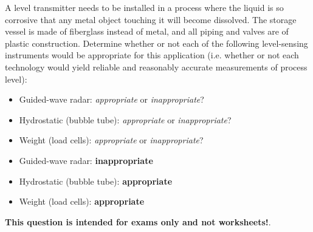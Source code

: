 

A level transmitter needs to be installed in a process where the liquid is so corrosive that any metal object touching it will become dissolved.  The storage vessel is made of fiberglass instead of metal, and all piping and valves are of plastic construction.  Determine whether or not each of the following level-sensing instruments would be appropriate for this application (i.e. whether or not each technology would yield reliable and reasonably accurate measurements of process level):

\begin{itemize}
\item{} Guided-wave radar: {\it appropriate} or {\it inappropriate}?
\vskip 10pt
\item{} Hydrostatic (bubble tube): {\it appropriate} or {\it inappropriate}?
\vskip 10pt
\item{} Weight (load cells): {\it appropriate} or {\it inappropriate}?
\end{itemize}







\begin{itemize}
\item{} Guided-wave radar: {\bf inappropriate}
\vskip 10pt
\item{} Hydrostatic (bubble tube): {\bf appropriate}
\vskip 10pt
\item{} Weight (load cells): {\bf appropriate}
\end{itemize}







{\bf This question is intended for exams only and not worksheets!}.



